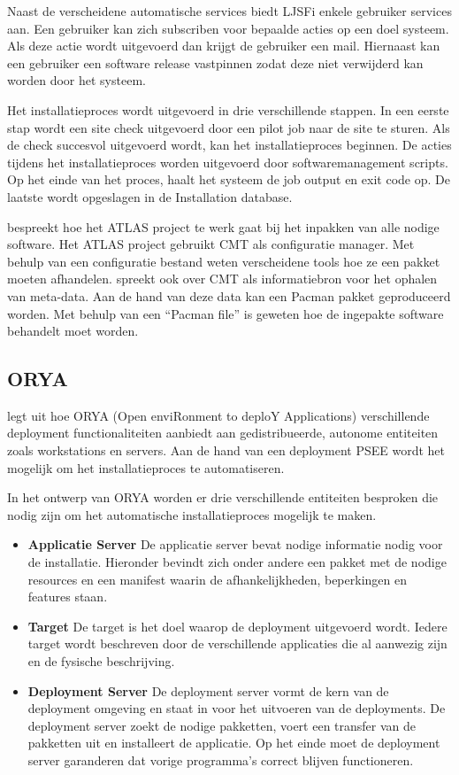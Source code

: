 Naast de verscheidene automatische services biedt LJSFi enkele gebruiker services aan.
Een gebruiker kan zich subscriben voor bepaalde acties op een doel systeem.
Als deze actie wordt uitgevoerd dan krijgt de gebruiker een mail.
Hiernaast kan een gebruiker een software release vastpinnen zodat deze niet verwijderd kan worden door het systeem.

Het installatieproces wordt uitgevoerd in drie verschillende stappen.
In een eerste stap wordt een site check uitgevoerd door een pilot job naar de site te sturen.
Als de check succesvol uitgevoerd wordt, kan het installatieproces beginnen.
De acties tijdens het installatieproces worden uitgevoerd door softwaremanagement scripts.
Op het einde van het proces, haalt het systeem de job output en exit code op.
De laatste wordt opgeslagen in de Installation database.

\citet{Obreshkov2008244} bespreekt hoe het ATLAS project te werk gaat bij het inpakken van alle nodige software.
Het ATLAS project gebruikt CMT \citep{cmt} als configuratie manager.
Met behulp van een configuratie bestand weten verscheidene tools hoe ze een pakket moeten afhandelen.
\citet{packAtlas} spreekt ook over CMT als informatiebron voor het ophalen van meta-data.
Aan de hand van deze data kan een Pacman pakket geproduceerd worden.
Met behulp van een ``Pacman file'' is geweten hoe de ingepakte software behandelt moet worden.

\subsection{ORYA}\label{sec:ORYA}
\citet{lestideau2003providing} legt uit hoe ORYA (Open enviRonment to deploY Applications) verschillende deployment functionaliteiten aanbiedt aan gedistribueerde, autonome entiteiten zoals workstations en servers.
Aan de hand van een deployment PSEE \citep{belkhatir2007adele} wordt het mogelijk om het installatieproces te automatiseren.

In het ontwerp van ORYA worden er drie verschillende entiteiten besproken die nodig zijn om het automatische installatieproces mogelijk te maken.
\begin{itemize}
\item \textbf{Applicatie Server} De applicatie server bevat nodige informatie nodig voor de installatie.
Hieronder bevindt zich onder andere een pakket met de nodige resources en een manifest waarin de afhankelijkheden, beperkingen en features staan.
\item \textbf{Target} De target is het doel waarop de deployment uitgevoerd wordt.
Iedere target wordt beschreven door de verschillende applicaties die al aanwezig zijn en de fysische beschrijving.
\item \textbf{Deployment Server} De deployment server vormt de kern van de deployment omgeving en staat in voor het uitvoeren van de deployments. 
De deployment server zoekt de nodige pakketten, voert een transfer van de pakketten uit en installeert de applicatie.
Op het einde moet de deployment server garanderen dat vorige programma's correct blijven functioneren.
\end{itemize}

